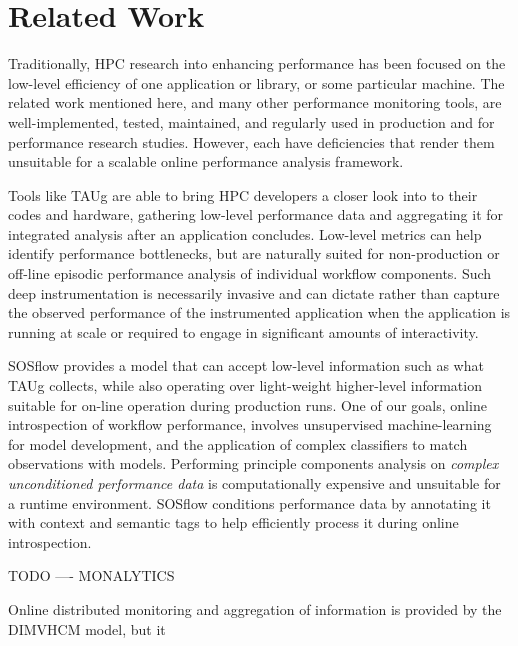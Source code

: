 
\section{Related Work}
%
Traditionally, HPC research into enhancing performance has been
focused on the low-level efficiency of one application or library, or
some particular machine.
%
The related work mentioned here, and many other performance monitoring
tools, are well-implemented, tested, maintained, and regularly used
in production and for performance research studies.
%
However, each have deficiencies that render them unsuitable for a scalable
online performance analysis framework.
%
\par
%
Tools like TAUg \cite{huck2006taug} are able to bring HPC developers a closer look into to
their codes and hardware, gathering low-level performance data and
aggregating it for integrated analysis after an application concludes.
%
Low-level metrics can help identify performance bottlenecks, but are
naturally suited for non-production or off-line episodic performance
analysis of individual workflow components.
%
Such deep instrumentation is necessarily invasive and can dictate
rather than capture the observed performance of the instrumented
application when the application is running at scale or required to
engage in significant amounts of interactivity.
%
\par
%
SOSflow provides a model that can accept low-level information such as
what TAUg collects, while also operating over light-weight higher-level
information suitable for on-line operation during production runs.
%
One of our goals, online introspection of workflow performance,
involves unsupervised machine-learning for model development, and the
application of complex classifiers to match observations with models.
%
Performing principle components analysis on \textit{complex unconditioned
  performance data} is computationally expensive and unsuitable for a
runtime environment.
%
SOSflow conditions performance data by annotating it with context and
semantic tags to help efficiently process it during online
introspection.
%
\par
%
TODO ---- MONALYTICS
%
\par
%
Online distributed monitoring and aggregation of information is
provided by the DIMVHCM \cite{tesser2012dimvhcm} model, but it
